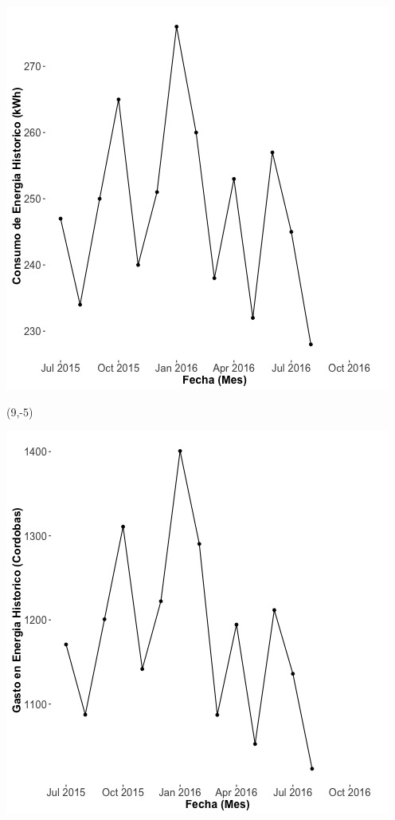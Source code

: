 \documentclass{article}\usepackage[]{graphicx}\usepackage[]{color}
\newenvironment{knitrout}{}{} %
\begin{document}
\begin{knitrout}
\color{fgcolor}
\includegraphics[scale=0.65]{figure/A18_historico_energia} 
\end{knitrout}

 \begin{textblock}{1}(9,-5)
\begin{minipage}{20em}
\begingroup

\endgroup
\end{minipage}
\end{textblock}

\begin{knitrout}
\color{fgcolor}
\includegraphics[scale=0.65]{figure/A18_historico_cordobas} 
\end{knitrout}
\end{document}
